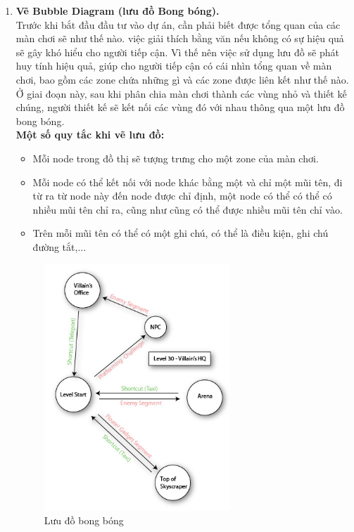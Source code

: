 \begin{enumerate}
	
	\item \textbf{Vẽ Bubble Diagram (lưu đồ Bong bóng).}\\
	\hspace*{1cm}  Trước khi bắt đầu đầu tư vào dự án, cần phải biết được tổng quan của các màn chơi sẽ như thế nào. việc giải thích bằng văn nếu không có sự hiệu quả sẽ gây khó hiểu cho người tiếp cận. Vì thế nên việc sử dụng lưu đồ sẽ phát huy tính hiệu quả, giúp cho người tiếp cận có cái nhìn tổng quan về màn chơi, bao gồm các zone chứa những gì và các zone được liên kết như thế nào. Ở giai đoạn này, sau khi phân chia màn chơi thành các vùng nhỏ và thiết kế chúng, người thiết kế sẽ kết nối các vùng đó với nhau thông qua một lưu đồ bong bóng.\\
	\textbf{Một số quy tắc khi vẽ lưu đồ:}
	\begin{itemize}
		\item Mỗi node trong đồ thị sẽ tượng trưng cho một zone của màn chơi.
		\item Mỗi node có thể kết nối với node khác bằng một và chỉ một mũi tên, đi từ ra từ node này đến node được chỉ định, một node có thể có thể có nhiều mũi tên chỉ ra, cũng như cũng có thể được nhiều mũi tên chỉ vào.
		\item Trên  mỗi mũi tên có thể có một ghi chú, có thể là điều kiện, ghi chú đường tắt,...
	\end{itemize}
	\begin{figure}[H]
		\centering
		\includegraphics[width=7cm]{Images/bubblediagram.jpg}
		\vspace{0.5cm}
		\caption{Lưu đồ bong bóng}
	\end{figure}
	\hspace*{1cm} 

\end{enumerate}
